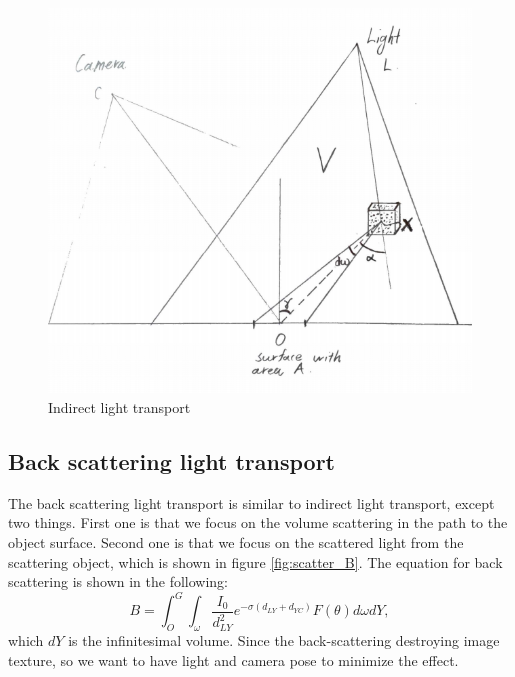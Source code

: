 \documentclass{article}
\begin{document}
\begin{figure}[h]
    \centering
    \includegraphics[width=\textwidth]{A.png}
    \caption{Indirect light transport}
    \label{fig:scatter_A}
\end{figure}

\subsection{Back scattering light transport}
The back scattering light transport is similar to indirect light transport, except two things. First one is that we focus on the volume scattering in the path to the object surface. Second one is that we focus on the scattered light from the scattering object, which is shown in figure \ref{fig:scatter_B}. The equation for back scattering is shown in the following:
\begin{equation}
    B =  \int_O^G \int_\omega \frac{I_0}{d_{LY}^2} e^{-\sigma(d_{LY}+d_{YC})}F(\theta)d\omega dY,
    \label{eq:B}
\end{equation}
which $dY$ is the infinitesimal volume. Since the back-scattering destroying image texture, so we want to have light and camera pose to minimize the effect.
\end{document}
